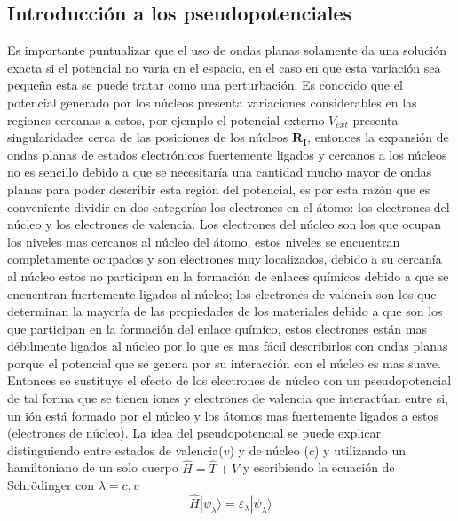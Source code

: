 \documentclass[12pt,a4paper, oneside]{book}
\begin{document}
   \subsection{Introducci\'on a los pseudopotenciales} \label{subsec:introPseudo}
   Es importante puntualizar que el uso de ondas planas solamente da una soluci\'on exacta si el potencial no var\'ia en el espacio, en el caso en que esta variaci\'on sea peque\~na esta se puede tratar como una perturbaci\'on. Es conocido que el potencial generado por los n\'ucleos presenta variaciones considerables en las regiones cercanas a estos, por ejemplo el potencial externo $V_{ext}$ presenta singularidades cerca de las posiciones de los n\'ucleos $\pmb{R_I}$, entonces la expansi\'on de ondas planas de estados electr\'onicos fuertemente ligados y cercanos a los n\'ucleos no es sencillo debido a que se necesitar\'ia una cantidad mucho mayor de ondas planas para poder describir esta regi\'on del potencial, es por esta raz\'on que es conveniente dividir en dos categor\'ias los electrones en el \'atomo: los electrones del n\'ucleo y los electrones de valencia. Los electrones del n\'ucleo son los que ocupan los niveles mas cercanos al n\'ucleo del \'atomo, estos niveles se encuentran completamente ocupados y son electrones muy localizados, debido a su cercan\'ia al n\'ucleo estos no participan en la formaci\'on de enlaces qu\'imicos debido a que se encuentran fuertemente ligados al n\'ucleo; los electrones de valencia son los que determinan la mayor\'ia de las propiedades de los materiales debido a que son los que participan en la formaci\'on del enlace qu\'imico, estos electrones est\'an mas d\'ebilmente ligados al n\'ucleo por lo que es mas f\'acil describirlos con ondas planas porque el potencial que se genera por su interacci\'on con el n\'ucleo es mas suave.  Entonces se sustituye el efecto de los electrones de n\'ucleo con un pseudopotencial de tal forma que se tienen iones y electrones de valencia que interact\'uan entre si, un i\'on est\'a formado por el n\'ucleo y los \'atomos mas fuertemente ligados a estos (electrones de n\'ucleo).
   \newline
   La idea del pseudopotencial se puede explicar distinguiendo entre estados de valencia($v$) y de n\'ucleo ($c$) y utilizando un hamiltoniano de un solo cuerpo $\hat{H} = \hat{T} + \hat{V}$ y escribiendo la ecuaci\'on de Schr\"odinger con $\lambda= c,v$
   \begin{equation*}
   \hat{H} | \psi_{\lambda} \rangle = \varepsilon_{\lambda} | \psi_{\lambda} \rangle 
   \end{equation*}    
\end{document}
